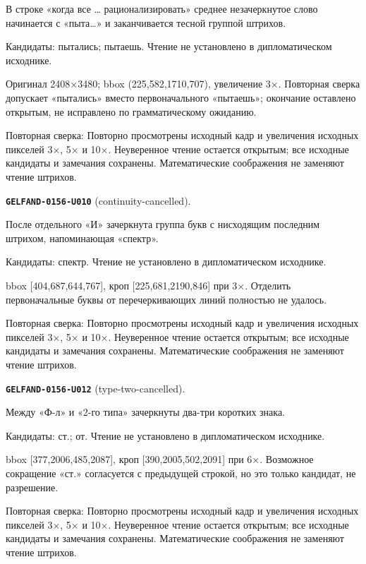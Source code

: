 В строке «когда все … рационализировать» среднее незачеркнутое слово начинается с «пыта…» и заканчивается тесной группой штрихов.\par
Кандидаты: пытались; пытаешь. Чтение не установлено в дипломатическом исходнике.\par
Оригинал 2408×3480; bbox (225,582,1710,707), увеличение 3×. Повторная сверка допускает «пытались» вместо первоначального «пытаешь»; окончание оставлено открытым, не исправлено по грамматическому ожиданию.\par
Повторная сверка: Повторно просмотрены исходный кадр и увеличения исходных пикселей 3×, 5× и 10×. Неуверенное чтение остается открытым; все исходные кандидаты и замечания сохранены. Математические соображения не заменяют чтение штрихов.\par\medskip
\par\noindent\leavevmode{}\label{GELFAND-0156-U010}\label{GELFAND-P001439:continuity-cancelled}\textbf{\texttt{GELFAND-0156-U010}} (continuity-cancelled).\nopagebreak[4]\par
После отдельного «И» зачеркнута группа букв с нисходящим последним штрихом, напоминающая «спектр».\par
Кандидаты: спектр. Чтение не установлено в дипломатическом исходнике.\par
bbox [404,687,644,767], кроп [225,681,2190,846] при 3×. Отделить первоначальные буквы от перечеркивающих линий полностью не удалось.\par
Повторная сверка: Повторно просмотрены исходный кадр и увеличения исходных пикселей 3×, 5× и 10×. Неуверенное чтение остается открытым; все исходные кандидаты и замечания сохранены. Математические соображения не заменяют чтение штрихов.\par\medskip
\par\noindent\leavevmode{}\label{GELFAND-0156-U012}\label{GELFAND-P001439:type-two-cancelled}\textbf{\texttt{GELFAND-0156-U012}} (type-two-cancelled).\nopagebreak[4]\par
Между «Ф-л» и «2-го типа» зачеркнуты два-три коротких знака.\par
Кандидаты: ст.; от. Чтение не установлено в дипломатическом исходнике.\par
bbox [377,2006,485,2087], кроп [390,2005,502,2091] при 6×. Возможное сокращение «ст.» согласуется с предыдущей строкой, но это только кандидат, не разрешение.\par
Повторная сверка: Повторно просмотрены исходный кадр и увеличения исходных пикселей 3×, 5× и 10×. Неуверенное чтение остается открытым; все исходные кандидаты и замечания сохранены. Математические соображения не заменяют чтение штрихов.\par\medskip
